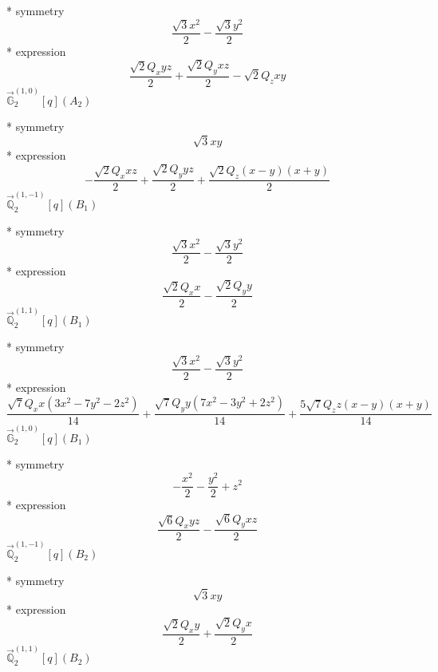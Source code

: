 \documentclass[fleqn,8pt]{jsarticle}
\begin{document}
\noindent\quad ** symmetry
\begin{dmath*}
\frac{\sqrt{3} x^{2}}{2} - \frac{\sqrt{3} y^{2}}{2}
\end{dmath*}
\noindent\quad ** expression
\begin{dmath*}
\frac{\sqrt{2} Q_{x} y z}{2} + \frac{\sqrt{2} Q_{y} x z}{2} - \sqrt{2} Q_{z} x y
\end{dmath*}
\noindent\quad $\vec{\mathbb{G}}_{2}^{(1,0)}[q](A_{2})$

\noindent\quad ** symmetry
\begin{dmath*}
\sqrt{3} x y
\end{dmath*}
\noindent\quad ** expression
\begin{dmath*}
- \frac{\sqrt{2} Q_{x} x z}{2} + \frac{\sqrt{2} Q_{y} y z}{2} + \frac{\sqrt{2} Q_{z} \left(x - y\right) \left(x + y\right)}{2}
\end{dmath*}
\noindent\quad $\vec{\mathbb{Q}}_{2}^{(1,-1)}[q](B_{1})$

\noindent\quad ** symmetry
\begin{dmath*}
\frac{\sqrt{3} x^{2}}{2} - \frac{\sqrt{3} y^{2}}{2}
\end{dmath*}
\noindent\quad ** expression
\begin{dmath*}
\frac{\sqrt{2} Q_{x} x}{2} - \frac{\sqrt{2} Q_{y} y}{2}
\end{dmath*}
\noindent\quad $\vec{\mathbb{Q}}_{2}^{(1,1)}[q](B_{1})$

\noindent\quad ** symmetry
\begin{dmath*}
\frac{\sqrt{3} x^{2}}{2} - \frac{\sqrt{3} y^{2}}{2}
\end{dmath*}
\noindent\quad ** expression
\begin{dmath*}
\frac{\sqrt{7} Q_{x} x \left(3 x^{2} - 7 y^{2} - 2 z^{2}\right)}{14} + \frac{\sqrt{7} Q_{y} y \left(7 x^{2} - 3 y^{2} + 2 z^{2}\right)}{14} + \frac{5 \sqrt{7} Q_{z} z \left(x - y\right) \left(x + y\right)}{14}
\end{dmath*}
\noindent\quad $\vec{\mathbb{G}}_{2}^{(1,0)}[q](B_{1})$

\noindent\quad ** symmetry
\begin{dmath*}
- \frac{x^{2}}{2} - \frac{y^{2}}{2} + z^{2}
\end{dmath*}
\noindent\quad ** expression
\begin{dmath*}
\frac{\sqrt{6} Q_{x} y z}{2} - \frac{\sqrt{6} Q_{y} x z}{2}
\end{dmath*}
\noindent\quad $\vec{\mathbb{Q}}_{2}^{(1,-1)}[q](B_{2})$

\noindent\quad ** symmetry
\begin{dmath*}
\sqrt{3} x y
\end{dmath*}
\noindent\quad ** expression
\begin{dmath*}
\frac{\sqrt{2} Q_{x} y}{2} + \frac{\sqrt{2} Q_{y} x}{2}
\end{dmath*}
\noindent\quad $\vec{\mathbb{Q}}_{2}^{(1,1)}[q](B_{2})$
\end{document}
